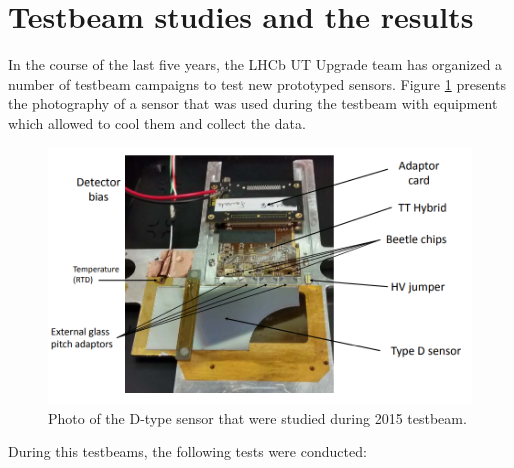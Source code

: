 \section{Testbeam studies and the results}
In the course of the last five years, the LHCb UT Upgrade team has organized a number of testbeam campaigns to test new prototyped sensors. Figure \ref{fig:DUT} presents the photography of a sensor that was used during the testbeam with equipment which allowed to cool
them and collect the data. 

\begin{figure}
\centering
\includegraphics{figures/Sensor_photo.PNG}
\caption{Photo of the D-type sensor that were studied during 2015 testbeam.}
\label{fig:DUT}
\end{figure}



During this testbeams, the following tests were conducted: 

